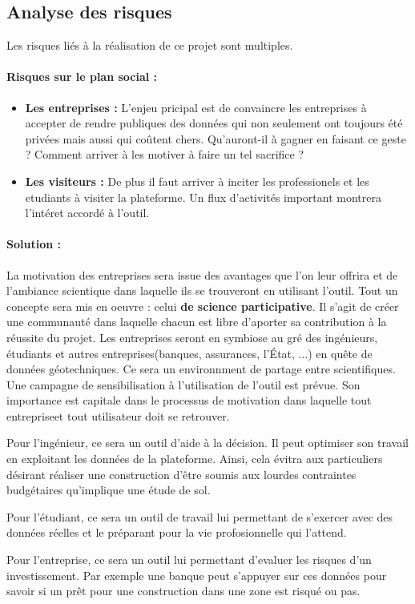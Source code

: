         \subsection{Analyse des risques}
        Les risques liés à la réalisation de ce projet sont multiples.
        \paragraph{Risques sur le plan social :}
        \begin{itemize}
            \item \textbf{Les entreprises :}
            L'enjeu pricipal est de convaincre les entreprises à accepter de rendre publiques des 
            données qui non seulement ont toujours été privées mais aussi qui coûtent chers. 
            Qu'auront-il à gagner en faisant ce geste ? 
            Comment arriver à les motiver à faire un tel sacrifice ?
            \item \textbf{Les visiteurs :}
            De plus il faut arriver à inciter les professionels et les etudiants à
            visiter la plateforme. Un flux d'activités important montrera l'intéret accordé à l'outil.
        \end{itemize}
        
        \paragraph{Solution :}
        La motivation des entreprises sera issue des avantages que l'on leur offrira et de l'ambiance
        scientique dans laquelle ils se trouveront en utilisant l'outil. 
        Tout un concepte sera mis en oeuvre : celui  \textbf{de science participative}.
        Il s'agit de créer une communauté dans laquelle chacun est libre d'aporter sa contribution 
        à la réussite du projet. Les entreprises seront en symbiose au gré des ingénieurs, étudiants 
        et autres entreprises(banques, assurances, l'État, ...) en quête de données géotechniques.
        Ce sera un environnment de partage entre scientifiques. Une campagne de sensibilisation à l'utilisation 
        de l'outil est prévue. Son importance est capitale dans le processus de motivation dans laquelle 
        tout entrepriseet tout utilisateur doit se retrouver.
        \par
        Pour l'ingénieur, ce sera un outil d'aide à la décision. Il peut optimiser son travail en exploitant
        les données de la plateforme. Ainsi, cela évitra aux particuliers désirant réaliser une construction
        d'être soumis aux lourdes contraintes budgétaires qu'implique une étude de sol.
        \par
        Pour l'étudiant, ce sera un outil de travail lui permettant de s'exercer avec des données réelles 
        et le préparant pour la vie profosionnelle qui l'attend.
        \par
        Pour l'entreprise, ce sera un outil lui permettant d'evaluer les risques d'un investissement. Par 
        exemple une banque peut s'appuyer sur ces données pour savoir si un prêt pour une construction dans une zone
        est risqué ou pas.

